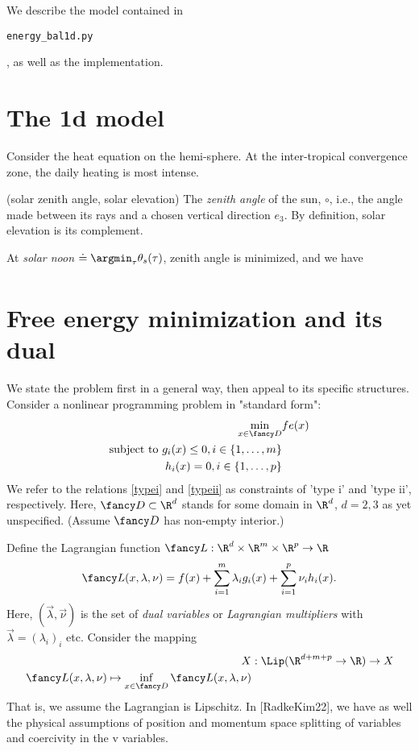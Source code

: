 
We describe the model contained in \begin{verbatim}
energy_bal1d.py\end{verbatim}, as well as the implementation. 

\section{The 1d model} 
	Consider the heat equation on the hemi-sphere. At the 
	inter-tropical convergence zone, the daily heating is most
	intense.  
	
	\begin{defn}{ (solar zenith angle, solar elevation) }
		The \emph{zenith angle} of the sun, $\circ$, i.e., the
		angle made between its rays and a chosen vertical 
		direction
		$e_3$. By definition, solar elevation is its complement.
		
		At \emph{solar noon} 
		$\doteq \argmin_\tau \theta_s(\tau)$,
		zenith angle is minimized, and we have
		\begin{align}
				
		\end{align}
	\end{defn}
	
\section{Free energy minimization and its dual}

We state the problem first in a general way, then appeal to its
specific structures. Consider a nonlinear programming problem
in "standard form":
\begin{align}
	\min_{x \in \fancy D} & fe(x)	\label{fe_min}	\\
	\text{subject to }	g_i(x) \leq 0, i \in \{ 1, \ldots, m \}	
						\label{typei}	\\
						h_i(x) = 0, i \in \{ 1, \ldots, p \}
						\label{typeii}
\end{align}
We refer to the relations \eqref{typei} and \eqref{typeii} as
constraints of 'type i' and 'type ii', respectively. Here, $\fancy
D \subset \R^d$ stands for some domain in $\R^d$, $d=2,3$ as yet
unspecified. (Assume $\fancy D$ has non-empty interior.)

Define the Lagrangian function 
$\fancy L:\R^d \times \R^m \times \R^p \rightarrow \R$
\begin{align}
	\fancy L(x,\lambda,\nu) = f(x) 
			+ \sum_{i=1}^m \lambda_i g_i(x) 
			+ \sum_{i=1}^p \nu_i h_i(x).
\end{align}
Here, $(\vec{\lambda},\vec{\nu})$ is the set of \emph{dual
variables} or \emph{Lagrangian multipliers} with
$\vec{\lambda} = (\lambda_i)_i$ etc. 
Consider the mapping 
\begin{align}\label{duality_transform}
	X & : \Lip(\R^{d+m+p} \rightarrow \R) \rightarrow X	\\
	\fancy L(x,\lambda,\nu) \mapsto 
	\inf_{x \in \fancy D} \fancy L(x,\lambda,\nu)
\end{align}
That is, we assume the Lagrangian is Lipschitz. In [RadkeKim22],
we have as well the physical assumptions of position and momentum
space splitting of variables and coercivity in the v variables.

